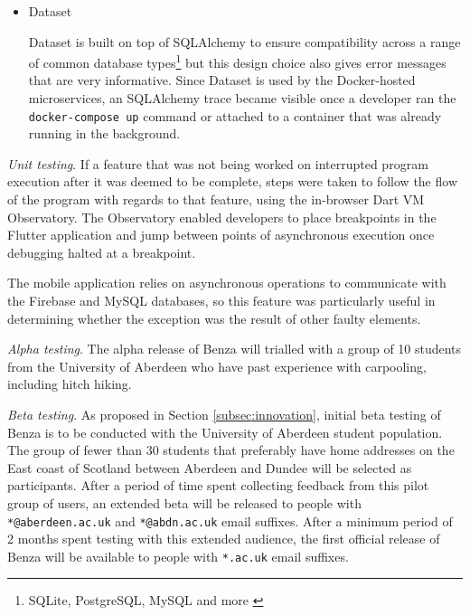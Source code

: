 \documentclass{article}
\begin{document}
\begin{itemize}
        \item Dataset \par
        Dataset is built on top of SQLAlchemy to ensure compatibility across a range of common database types\footnote{SQLite, PostgreSQL, MySQL and more \cite{datasetquickstartdocs}} but this design choice also gives error messages that are very informative. Since Dataset is used by the Docker-hosted microservices, an SQLAlchemy \gls{trace} became visible once a developer ran the \texttt{docker-compose up} command or attached to a container that was already running in the background. \par
    \end{itemize}
    
    \emph{Unit testing}. If a feature that was not being worked on interrupted program execution after it was deemed to be complete, steps were taken to follow the flow of the program with regards to that feature, using the in-browser Dart VM Observatory. The Observatory enabled developers to place breakpoints in the Flutter application and jump between points of asynchronous execution once debugging halted at a breakpoint. \par
    
    The mobile application relies on asynchronous operations to communicate with the Firebase and MySQL databases, so this feature was particularly useful in determining whether the exception was the result of other faulty elements. 
    
    \emph{Alpha testing}. The alpha release of Benza will trialled with a group of 10 students from the University of Aberdeen who have past experience with carpooling, including hitch hiking.
    
    \emph{Beta testing}. As proposed in Section \ref{subsec:innovation}, initial beta testing of Benza is to be conducted with the University of Aberdeen student population. The group of fewer than 30 students that preferably have home addresses on the East coast of Scotland between Aberdeen and Dundee will be selected as participants. 
    After a period of time spent collecting feedback from this pilot group of users, an extended beta will be released to people with \texttt{*@aberdeen.ac.uk} and \texttt{*@abdn.ac.uk} email suffixes. After a minimum period of 2 months spent testing with this extended audience, the first official release of Benza will be available to people with \texttt{*.ac.uk} email suffixes. \par
    
\end{document}
